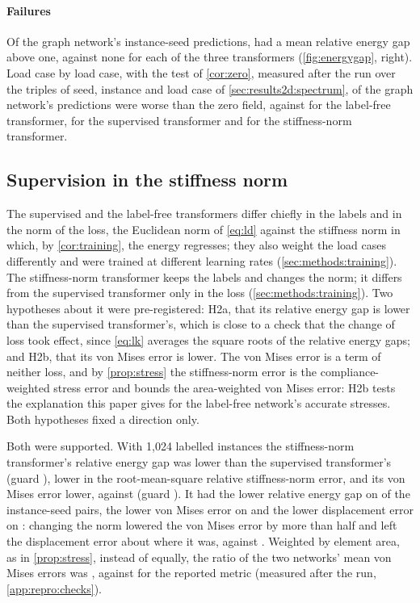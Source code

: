 \paragraph{Failures}
Of the graph network's \numCmPairs{} instance-seed predictions, \numCmMgnWorse{} had a mean
relative energy gap above one, against none for each of the three transformers
(\cref{fig:energygap}, right). Load case by load case, with the test of \cref{cor:zero},
measured after the run over the \numSpecLoads{} triples of seed, instance and load case of
\cref{sec:results2d:spectrum}, \numSpecLoadWorseMgn{} of the graph network's predictions
were worse than the zero field, against \numSpecLoadWorseFree{} for the label-free
transformer, \numSpecLoadWorseLab{} for the supervised transformer and
\numSpecLoadWorseKnorm{} for the stiffness-norm transformer.

\subsection{Supervision in the stiffness norm}\label{sec:results2d:norm}

The supervised and the label-free transformers differ chiefly in the labels and in the norm
of the loss, the Euclidean norm of \eqref{eq:ld} against the stiffness norm in which, by
\cref{cor:training}, the energy regresses; they also weight the load cases differently and
were trained at different learning rates (\cref{sec:methods:training}). The stiffness-norm
transformer keeps the labels and changes the norm; it differs from the supervised
transformer only in the loss (\cref{sec:methods:training}). Two hypotheses about it were
pre-registered: H2a, that its relative energy gap is lower than the supervised
transformer's, which is close to a check that the change of loss took effect, since
\eqref{eq:lk} averages the square roots of the relative energy gaps; and H2b, that its von
Mises error is lower. The von Mises error is a term of neither loss, and by
\cref{prop:stress} the stiffness-norm error is the compliance-weighted stress error and
bounds the area-weighted von Mises error: H2b tests the explanation this paper gives for the
label-free network's accurate stresses. Both hypotheses fixed a direction only.

Both were supported. With 1,024 labelled instances the stiffness-norm transformer's relative
energy gap was \numHTwoARel{} lower than the supervised transformer's (guard
\numHTwoATau{}), \numHTwoARootRel{} lower in the root-mean-square relative stiffness-norm
error, and its von Mises error \numHTwoBRel{} lower, \numCmKnormVm{} against \numCmLabVm{}
(guard \numHTwoBTau{}). It had the lower relative energy gap on \numPairCmKnormLabGap{} of
the instance-seed pairs, the lower von Mises error on \numPairCmKnormLabVm{} and the lower
displacement error on \numPairCmKnormLabDisp{}: changing the norm lowered the von Mises
error by more than half and left the displacement error about where it was,
\numCmKnormDisp{} against \numCmLabDisp{}. Weighted by element area, as in
\cref{prop:stress}, instead of equally, the ratio of the two networks' mean von Mises errors
was \numSpecVmAreaRatio{}, against \numSpecVmElemRatio{} for the reported metric (measured
after the run, \ref{app:repro:checks}).

